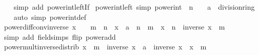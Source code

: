 \begin{isabellebody}
%
\isadelimproof
\ \ %
\endisadelimproof
%
\isatagproof
{}\isamarkupfalse%
\ {\isacharparenleft}{\kern0pt}simp\ add{\isacharcolon}{\kern0pt}\ power{\isacharunderscore}{\kern0pt}int{\isacharunderscore}{\kern0pt}{}{\isacharunderscore}{\kern0pt}left{\isacharunderscore}{\kern0pt}If{\isacharparenright}{\kern0pt}%
\endisatagproof
{\isafoldproof}%
%
\isadelimproof
\isanewline
%
\endisadelimproof
\isanewline
{}\isamarkupfalse%
\ power{\isacharunderscore}{\kern0pt}int{\isacharunderscore}{\kern0pt}{}{\isacharunderscore}{\kern0pt}left\ {\isacharbrackleft}{\kern0pt}simp{\isacharbrackright}{\kern0pt}{\isacharcolon}{\kern0pt}\ {\isachardoublequoteopen}power{\isacharunderscore}{\kern0pt}int\ {}\ n\ {\isacharequal}{\kern0pt}\ {\isacharparenleft}{\kern0pt}{}\ {\isacharcolon}{\kern0pt}{\isacharcolon}{\kern0pt}\ {\isacharprime}{\kern0pt}a\ {\isacharcolon}{\kern0pt}{\isacharcolon}{\kern0pt}\ division{\isacharunderscore}{\kern0pt}ring{\isacharparenright}{\kern0pt}{\isachardoublequoteclose}\isanewline
%
\isadelimproof
\ \ %
\endisadelimproof
%
\isatagproof
{}\isamarkupfalse%
\ {\isacharparenleft}{\kern0pt}auto\ simp{\isacharcolon}{\kern0pt}\ power{\isacharunderscore}{\kern0pt}int{\isacharunderscore}{\kern0pt}def{\isacharparenright}{\kern0pt}%
\endisatagproof
{\isafoldproof}%
%
\isadelimproof
\ \isanewline
%
\endisadelimproof
\isanewline
{}\isamarkupfalse%
\ power{\isacharunderscore}{\kern0pt}diff{\isacharunderscore}{\kern0pt}conv{\isacharunderscore}{\kern0pt}inverse{\isacharcolon}{\kern0pt}\ {\isachardoublequoteopen}x\ {\isasymnoteq}\ {}\ {\isasymLongrightarrow}\ m\ {\isasymle}\ n\ {\isasymLongrightarrow}\ {\isacharparenleft}{\kern0pt}x\ {\isacharcolon}{\kern0pt}{\isacharcolon}{\kern0pt}\ {\isacharprime}{\kern0pt}a{\isacharparenright}{\kern0pt}\ {\isacharcircum}{\kern0pt}\ {\isacharparenleft}{\kern0pt}n\ {\isacharminus}{\kern0pt}\ m{\isacharparenright}{\kern0pt}\ {\isacharequal}{\kern0pt}\ x\ {\isacharcircum}{\kern0pt}\ n\ {\isacharasterisk}{\kern0pt}\ inverse\ x\ {\isacharcircum}{\kern0pt}\ m{\isachardoublequoteclose}\isanewline
%
\isadelimproof
\ \ %
\endisadelimproof
%
\isatagproof
{}\isamarkupfalse%
\ {\isacharparenleft}{\kern0pt}simp\ add{\isacharcolon}{\kern0pt}\ field{\isacharunderscore}{\kern0pt}simps\ flip{\isacharcolon}{\kern0pt}\ power{\isacharunderscore}{\kern0pt}add{\isacharparenright}{\kern0pt}%
\endisatagproof
{\isafoldproof}%
%
\isadelimproof
\isanewline
%
\endisadelimproof
\isanewline
{}\isamarkupfalse%
\ power{\isacharunderscore}{\kern0pt}mult{\isacharunderscore}{\kern0pt}inverse{\isacharunderscore}{\kern0pt}distrib{\isacharcolon}{\kern0pt}\ {\isachardoublequoteopen}x\ {\isacharcircum}{\kern0pt}\ m\ {\isacharasterisk}{\kern0pt}\ inverse\ {\isacharparenleft}{\kern0pt}x\ {\isacharcolon}{\kern0pt}{\isacharcolon}{\kern0pt}\ {\isacharprime}{\kern0pt}a{\isacharparenright}{\kern0pt}\ {\isacharequal}{\kern0pt}\ inverse\ x\ {\isacharasterisk}{\kern0pt}\ x\ {\isacharcircum}{\kern0pt}\ m{\isachardoublequoteclose}\isanewline

\end{isabellebody}
